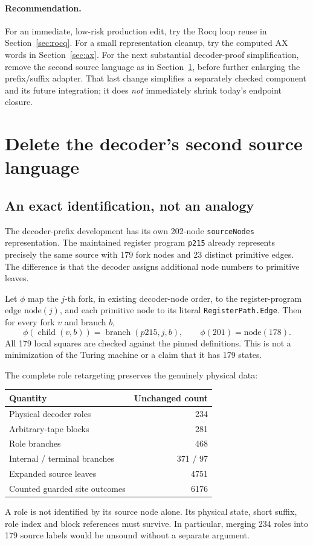 \documentclass[11pt]{article}
\begin{document}
\paragraph{Recommendation.}
For an immediate, low-risk production edit, try the Rocq loop reuse in Section~\ref{sec:rocq}. For a small representation cleanup, try the computed AX words in Section~\ref{sec:ax}. For the next substantial decoder-proof simplification, remove the second source language as in Section~\ref{sec:decoder}, before further enlarging the prefix/suffix adapter. That last change simplifies a separately checked component and its future integration; it does \emph{not} immediately shrink today's endpoint closure.

\section{Delete the decoder's second source language}\label{sec:decoder}
\subsection{An exact identification, not an analogy}
The decoder-prefix development has its own 202-node \texttt{sourceNodes} representation. The maintained register program \texttt{p215} already represents precisely the same source with 179 fork nodes and 23 distinct primitive edges. The difference is that the decoder assigns additional node numbers to primitive leaves.

Let $\phi$ map the $j$-th fork, in existing decoder-node order, to the register-program edge $\mathrm{node}(j)$, and each primitive node to its literal \texttt{RegisterPath.Edge}. Then for every fork $v$ and branch $b$,
\[
\phi(\operatorname{child}(v,b))
=\operatorname{branch}(p215,j,b),
\qquad \phi(201)=\mathrm{node}(178).
\]
All 179 local squares are checked against the pinned definitions. This is not a minimization of the Turing machine or a claim that it has 179 states.

The complete role retargeting preserves the genuinely physical data:
\begin{center}\small
\begin{tabular}{lr}
\toprule
Quantity&Unchanged count\\
\midrule
Physical decoder roles&234\\
Arbitrary-tape blocks&281\\
Role branches&468\\
Internal / terminal branches&371 / 97\\
Expanded source leaves&4751\\
Counted guarded site outcomes&6176\\
\bottomrule
\end{tabular}
\end{center}
A role is not identified by its source node alone. Its physical state, short suffix, role index and block references must survive. In particular, merging 234 roles into 179 source labels would be unsound without a separate argument.
\end{document}
